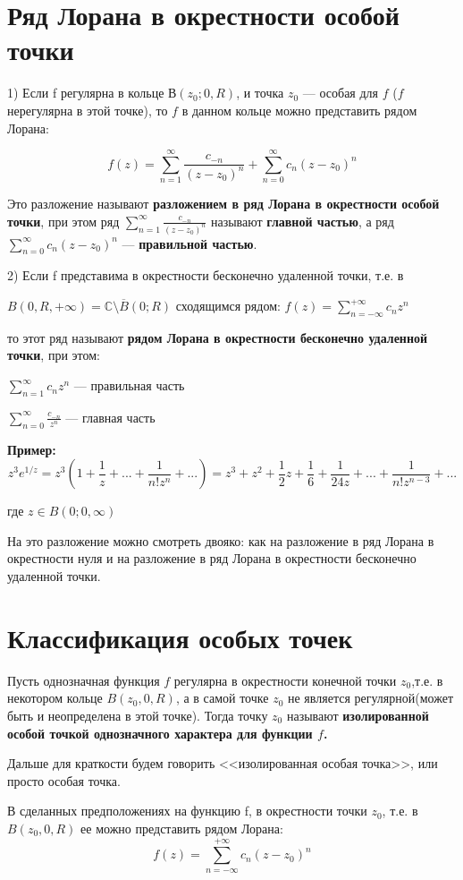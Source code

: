 \documentclass[a4paper, 12pt]{report}
\begin{document}
\section{Ряд Лорана в окрестности особой точки}

1) \quad Если f регулярна в кольце $В(z_0;0,R)$, и точка $z_0$ --- особая для $f$ ($f$ нерегулярна в этой точке), то $f$ в данном кольце можно представить рядом Лорана:

$$f(z)=\sum\limits_{n=1}^\infty \frac{c_{-n}}{(z-z_0)^n}+\sum\limits_{n=0}^\infty c_{n}(z-z_0)^n$$

Это разложение называют \textbf{разложением в ряд Лорана в окрестности особой точки}, при этом ряд  $\sum\limits_{n=1}^\infty \frac{c_{-n}}{(z-z_0)^n}$ называют \textbf{главной частью}, а ряд $\sum\limits_{n=0}^\infty c_{n}(z-z_0)^n$ --- \textbf{правильной частью}.
\bigskip

2) \quad Если f представима в окрестности бесконечно удаленной точки, т.е. в

$B(0,R,+\infty)=\mathbb{C}\setminus \overline{B}(0;R)$
сходящимся рядом:
$f(z)=\sum\limits_{n=-\infty}^{+\infty} c_n z^n$

то этот ряд называют\textbf{ рядом Лорана в окрестности бесконечно удаленной точки}, при этом:

$\sum\limits_{n=1}^{\infty} c_n z^n$ --- правильная часть


$\sum\limits_{n=0}^{\infty} \frac{c_{-n}}{ z^n}$ --- главная часть
\bigskip

\textbf{Пример:}
$$z^3e^{1/z}=z^3\left(1+\frac1{z}+...+\frac1{n!z^n}+...\right)=z^3+z^2+\frac1{2}z+\frac1{6}+\frac1{24z}+...+\frac{1}{n!z^{n-3}}+...$$

где $z\in B(0;0,\infty)$
\bigskip

На это разложение можно смотреть двояко: как на разложение в ряд Лорана в окрестности нуля и на разложение в ряд Лорана в окрестности бесконечно удаленной точки.

\section{Классификация особых точек}

Пусть однозначная функция $f$ регулярна в окрестности конечной точки $z_0$,т.е. в некотором кольце $B(z_0,0,R)$, а в самой точке $z_0$ не является регулярной(может быть и неопределена в этой точке). Тогда точку $z_0$ называют \textbf{изолированной особой точкой однозначного характера для функции $f$.} \par\bigskip Дальше для краткости будем говорить <<изолированная особая точка>>, или просто особая точка.
\par\bigskip
В сделанных предположениях на функцию f, в окрестности точки $z_0$, т.е. в $B(z_0,0,R)$ ее можно представить рядом Лорана:
$$f(z)=\sum\limits_{n=-\infty}^{+\infty} c_n (z-z_0)^n$$
\end{document}
